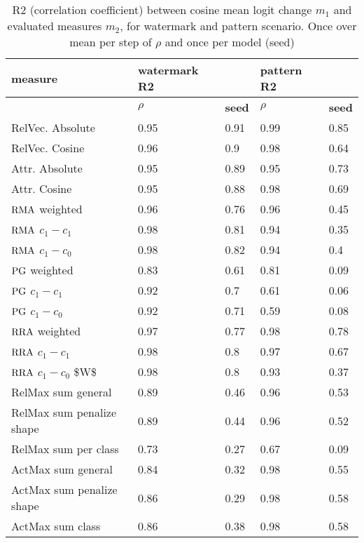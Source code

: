 \begin{table}[!ht]
    \centering
    \begin{tabular}{l|ll|ll}
    \hline
        \textbf{measure}& \textbf{watermark} R2 &  & \textbf{pattern} R2 &  \\ \hline
        & $\rho$ & \textbf{seed} & $\rho$  & \textbf{seed} \\ \hline
        RelVec. Absolute & 0.95 & 0.91 & 0.99 & 0.85 \\ \hline
        RelVec. Cosine & 0.96 & 0.9 & 0.98 & 0.64 \\ \hline
        Attr. Absolute & 0.95 & 0.89 & 0.95 & 0.73 \\ \hline
        Attr. Cosine & 0.95 & 0.88 & 0.98 & 0.69 \\ \hline
        $\operatorname*{RMA}$ weighted & 0.96 & 0.76 & 0.96 & 0.45 \\ \hline
        $\operatorname*{RMA}$ $c_1- c_1$ & 0.98 & 0.81 & 0.94 & 0.35 \\ \hline
        $\operatorname*{RMA}$ $c_1- c_0$ & 0.98 & 0.82 & 0.94 & 0.4 \\ \hline
         $\operatorname*{PG}$  weighted & 0.83 & 0.61 & 0.81 & 0.09 \\ \hline
         $\operatorname*{PG}$  $c_1- c_1$ & 0.92 & 0.7 & 0.61 & 0.06 \\ \hline
         $\operatorname*{PG}$  $c_1- c_0$ & 0.92 & 0.71 & 0.59 & 0.08 \\ \hline
        $\operatorname*{RRA}$ weighted & 0.97 & 0.77 & 0.98 & 0.78 \\ \hline
        $\operatorname*{RRA}$ $c_1- c_1$ & 0.98 & 0.8 & 0.97 & 0.67 \\ \hline
        $\operatorname*{RRA}$ $c_1- c_0$ \$W\$ & 0.98 & 0.8 & 0.93 & 0.37 \\ \hline
        RelMax sum general & 0.89 & 0.46 & 0.96 & 0.53 \\ \hline
        RelMax sum penalize shape & 0.89 & 0.44 & 0.96 & 0.52 \\ \hline
        RelMax sum per class & 0.73 & 0.27 & 0.67 & 0.09 \\ \hline
        ActMax sum general & 0.84 & 0.32 & 0.98 & 0.55 \\ \hline
        ActMax sum penalize shape & 0.86 & 0.29 & 0.98 & 0.58 \\ \hline
        ActMax sum class & 0.86 & 0.38 & 0.98 & 0.58 \\ \hline
    \end{tabular}
    \caption{R2 (correlation coefficient) between cosine mean logit change $m_1$ and evaluated measures $m_2$, for watermark and pattern scenario. Once over mean per step of $\rho$ and once per model (seed)}
\end{table}


